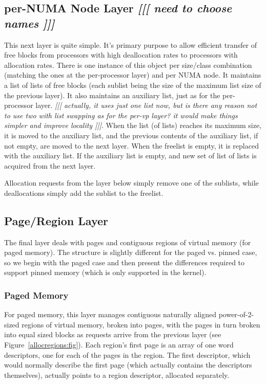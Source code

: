\documentclass[dvips,11pt]{article}
\newcommand\fixnote[1]{\emph{[[[ #1 ]]]}}
\begin{document}
\subsection{per-NUMA Node Layer \fixnote{need to choose names}}

This next layer is quite simple.  It's primary purpose to allow efficient
transfer of free blocks from processors with high deallocation rates to
processors with allocation rates.  There is one instance of this object per
size/class combination (matching the ones at the per-processor layer) and
per NUMA node.  It maintains a list of lists of free blocks (each sublist
being the size of the maximum list size of the previous layer).  It also
maintains an auxiliary list, just as for the per-processor layer.
\fixnote{actually, it uses just one list now, but is there any reason not
  to use two with list swapping as for the per-vp layer? it would make
  things simpler and improve locality}.  When the list (of lists) reaches
its maximum size, it is moved to the auxiliary list, and the previous
contents of the auxiliary list, if not empty, are moved to the next layer.
When the freelist is empty, it is replaced with the auxiliary list.  If the 
auxiliary list is empty, and new set of list of lists is acquired from the
next layer.

Allocation requests from the layer below simply remove one of the sublists, 
while deallocations simply add the sublist to the freelist.


\subsection{Page/Region Layer}

The final layer deals with pages and contiguous regions of virtual memory
(for paged memory).  The structure is slightly different for the paged vs.
pinned case, so we begin with the paged case and then present the
differences required to support pinned memory (which is only supported in
the kernel).

\subsubsection{Paged Memory}

For paged memory, this layer manages contiguous naturally aligned
power-of-2-sized regions of virtual memory, broken into pages, with the
pages in turn broken into equal sized blocks as requests arrive from the
previous layer (see Figure~\ref{allocregions:fig}).  Each region's first
page is an array of one word descriptors, one for each of the pages in the
region.  The first descriptor, which would normally describe the first page
(which actually contains the descriptors themselves), actually points to a
region descriptor, allocated separately.  
\end{document}
